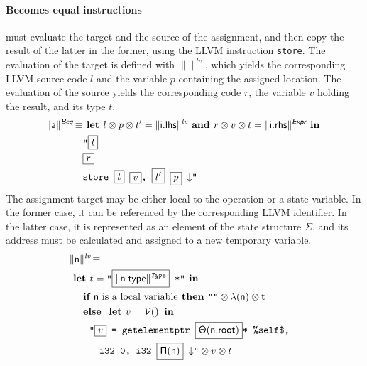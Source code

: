 \documentclass{llncs}
\newcommand{\trad}[2]{\ensuremath{\lVert \textsf{#1} \rVert^{\textit{#2}}}}
\newcommand{\nl}[0]{\ensuremath{\downarrow}}
\DeclareMathOperator{\conc}{\diamond}
\DeclareMathOperator{\isdef}{\equiv}
\DeclareMathOperator{\variable}{\mathcal{V}()}
\newcommand{\llvm}[1]{\texttt{#1}}
\newcommand{\B}[1]{\textsf{#1}}
\newcommand{\IF}[0]{\textbf{ if }}
\newcommand{\ELSE}[0]{\textbf{ else }}
\newcommand{\THEN}[0]{\textbf{ then }}
\newcommand{\LET}[0]{\textbf{ let }}
\newcommand{\IN}[0]{\textbf{ in }}
\newcommand{\AND}[0]{\textbf{ and }}
\newcommand{\PH}[1]{\framebox{$#1$}}
\newcommand{\sep}[0]{\otimes}
\newcommand{\local}[0]{\ensuremath{\sf\lambda}}
\newcommand{\idx}[0]{\ensuremath{\sf\Pi}}
\newcommand{\state}[0]{\ensuremath{\sf\Theta}}
\begin{document}
\begin{enumerate}
\paragraph{Becomes equal instructions} must evaluate the target and the source
of the assignment, and then copy the result of the latter in the former, using
the LLVM instruction \llvm{store}. The evaluation of the target is defined with
$\trad{}{lv}$, which yields the corresponding LLVM source code $l$ and the
variable $p$ containing the assigned location. The evaluation of the source
yields the corresponding code $r$, the variable $v$ holding the result, and its
type $t$.
\begin{align*}
\begin{split}
  \trad{a}{\B{Beq}} \isdef 
  & \LET l \sep p \sep t'= \trad{i.lhs}{lv} \AND r \sep v \sep t = \trad{i.rhs}{\B{Expr}} \IN \\
  & \llvm{"\PH{l}} \\
  & \llvm{\PH{r}} \\
  & \llvm{store \PH{t} \PH{v}, \PH{t'} \PH{p} \nl"}
\end{split}
\end{align*}
The assignment target may be either local to the operation or a state
variable. In the former case, it can be referenced by the corresponding LLVM
identifier. In the latter case, it is represented as an element of the state
structure $\Sigma$, and its address must be calculated and assigned to a new temporary
variable.
\begin{align*}
\lefteqn{\trad{n}{lv} \isdef} \\
& \LET t = \llvm{"\PH{\trad{\B{n.type}}{Type}} *"} \IN \\
& \quad \IF \mbox{\B{n} is a local variable} \THEN \llvm{""} \sep \local(\B{n}) \sep t \\
& \quad \ELSE \LET v = \variable \IN \\
& \quad \quad \llvm{"\PH{v} = getelementptr \PH{\state(\B{n.root})}* \%self\$,} \\
& \quad \quad \quad \llvm{i32 0, i32 \PH{\idx(\B{n})} \nl"} \sep v \sep t
\end{align*}


\end{enumerate}
\end{document}
